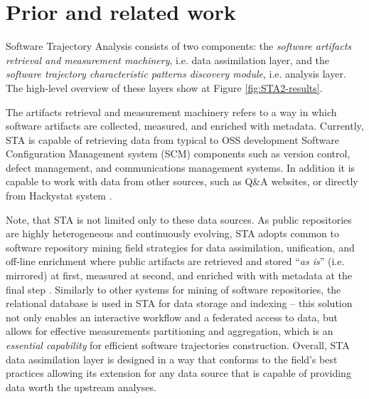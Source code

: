 \chapter{Prior and related work}\label{chapter_background_work}
Software Trajectory Analysis consists of two components: 
the \textit{software artifacts retrieval and measurement machinery}, i.e. data assimilation layer, 
and the \textit{software trajectory characteristic patterns discovery module}, i.e. analysis layer. 
The high-level overview of these layers show at Figure \ref{fig:STA2-results}.

The artifacts retrieval and measurement machinery refers to a way in which software artifacts are 
collected, measured, and enriched with metadata. 
Currently, STA is capable of retrieving data from typical to OSS development Software Configuration 
Management system (SCM) components such as version control, defect management, and communications 
management systems. In addition it is capable to work with data from other sources, such as Q\&A 
websites, or directly from Hackystat system \cite{csdl2-10-09}.

Note, that STA is not limited only to these data sources.
As public repositories are highly heterogeneous and continuously evolving, STA adopts common to software
repository mining field strategies for data assimilation, unification, and off-line enrichment 
where public artifacts are retrieved and stored ``\textit{as is}'' (i.e. mirrored) at first, 
measured at second, and enriched with with metadata at the final step \cite{german04_softchange}.
Similarly to other systems for mining of software repositories, the relational database is used in STA 
for data storage and indexing -- this solution not only enables an interactive workflow and a federated access to 
data, but allows for effective measurements partitioning and aggregation, which is 
an \textit{essential capability} for efficient software trajectories construction.
Overall, STA data assimilation layer is designed in a way that conforms to the field's best practices
allowing its extension for any data source that is capable of providing data worth the upstream analyses.


